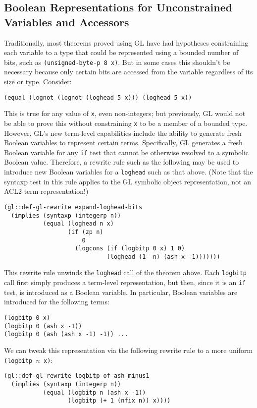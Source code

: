 \documentclass[submission,copyright,creativecommons]{eptcs}
\begin{document}
\subsection{Boolean Representations for Unconstrained Variables and Accessors}
\label{sec:vargen}
Traditionally, most theorems proved using GL have had hypotheses
constraining each variable to a type that could be represented using a
bounded number of bits, such as \texttt{(unsigned-byte-p 8 x)}.  But
in some cases this shouldn't be necessary because only certain bits
are accessed from the variable regardless of its size or type.
Consider:
\begin{verbatim}
(equal (lognot (lognot (loghead 5 x))) (loghead 5 x))
\end{verbatim}
This is true for any value of \texttt{x}, even non-integers; but
previously, GL would not be able to prove this without constraining
\texttt{x} to be a member of a bounded type.  However, GL's new
term-level capabilities include the ability to generate fresh Boolean
variables to represent certain terms.  Specifically, GL generates a
fresh Boolean variable for any \texttt{if} test that cannot be
otherwise resolved to a symbolic Boolean value.  Therefore, a rewrite
rule such as the following may be used to introduce new Boolean
variables for a \texttt{loghead} such as that above.  (Note that the
syntaxp test in this rule applies to the GL symbolic object
representation, not an ACL2 term representation!)
\begin{verbatim}
(gl::def-gl-rewrite expand-loghead-bits
  (implies (syntaxp (integerp n))
           (equal (loghead n x)
                  (if (zp n)
                      0
                    (logcons (if (logbitp 0 x) 1 0)
                             (loghead (1- n) (ash x -1)))))))
\end{verbatim}
This rewrite rule unwinds the \texttt{loghead} call of the theorem
above.  Each \texttt{logbitp} call first simply produces a term-level
representation, but then, since it is an \texttt{if} test, is
introduced as a Boolean variable.  In particular, Boolean variables
are introduced for the following terms:
\begin{verbatim}
(logbitp 0 x)
(logbitp 0 (ash x -1))
(logbitp 0 (ash (ash x -1) -1)) ...
\end{verbatim}
We can tweak this representation via the following rewrite rule to a more uniform \texttt{(logbitp $n$ x)}:
\begin{verbatim}
(gl::def-gl-rewrite logbitp-of-ash-minus1
  (implies (syntaxp (integerp n))
           (equal (logbitp n (ash x -1))
                  (logbitp (+ 1 (nfix n)) x))))
\end{verbatim}
\end{document}
